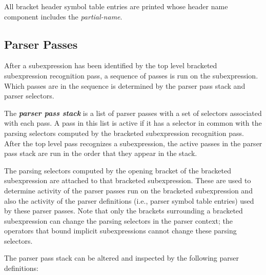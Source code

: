 \documentclass[12pt]{article}
\newcommand{\key}[1]{{\bf \em #1}\index{#1}}
\begin{document}
All bracket header symbol table entries are printed whose header name
component includes the {\em partial-name}.

\subsection{Parser Passes}

After a subexpression has been identified by the top level bracketed
subexpression recognition pass, a sequence of passes is run on the
subexpression.  Which passes are in the sequence is determined by the
parser pass stack and parser selectors.

The \key{parser pass stack} is a list of parser passes with a set of
selectors associated with each pass.  A pass in this list is active
if it has a selector in common with the parsing selectors computed
by the bracketed subexpression recognition pass.  After the top level pass
recognizes a subexpression, the active passes in the parser pass stack
are run in the order that they appear in the stack.

The parsing selectors
computed by the opening bracket of the bracketed subexpression
are attached to that bracketed subexpression.
These are used to determine activity of the parser passes run on the bracketed
subexpression and also the activity
of the parser definitions (i.e., parser symbol table entries)
used by these parser passes.
Note that only the brackets surrounding a bracketed subexpression
can change the parsing selectors in the parser context; the operators
that bound implicit subexpressions cannot change these parsing selectors.

The parser pass stack can be altered and inspected
by the following parser definitions:
\end{document}

